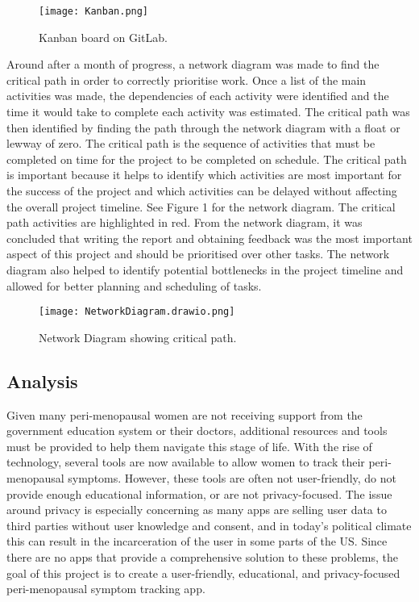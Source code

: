 \begin{figure}[h!!]
  \begin{center}
    \texttt{[image: Kanban.png]}
    \caption{Kanban board on GitLab.}
    \label{figure:kanban-board}
  \end{center}
\end{figure}

Around after a month of progress, a network diagram was made to find the critical path in order to correctly prioritise work. Once a list of the main activities was made, the dependencies of each activity were identified and the time it would take to complete each activity was estimated. The critical path was then identified by finding the path through the network diagram with a float or lewway of zero. The critical path is the sequence of activities that must be completed on time for the project to be completed on schedule. The critical path is important because it helps to identify which activities are most important for the success of the project and which activities can be delayed without affecting the overall project timeline. See Figure 1 for the network diagram. The critical path activities are highlighted in red. From the network diagram, it was concluded that writing the report and obtaining feedback was the most important aspect of this project and should be prioritised over other tasks. The network diagram also helped to identify potential bottlenecks in the project timeline and allowed for better planning and scheduling of tasks.

\begin{figure}[h!!]
  \begin{center}
    \texttt{[image: NetworkDiagram.drawio.png]}
    \caption{Network Diagram showing critical path.}
    \label{figure:network-diagram}
  \end{center}
\end{figure}
 
\subsection{Analysis}
Given many peri-menopausal women are not receiving support from the government education system or their doctors, additional resources and tools must be provided to help them navigate this stage of life. With the rise of technology, several tools are now available to allow women to track their peri-menopausal symptoms. However, these tools are often not user-friendly, do not provide enough educational information, or are not privacy-focused. The issue around privacy is especially concerning as many apps are selling user data to third parties without user knowledge and consent, and in today's political climate this can result in the incarceration of the user in some parts of the US. Since there are no apps that provide a comprehensive solution to these problems, the goal of this project is to create a user-friendly, educational, and privacy-focused peri-menopausal symptom tracking app.


